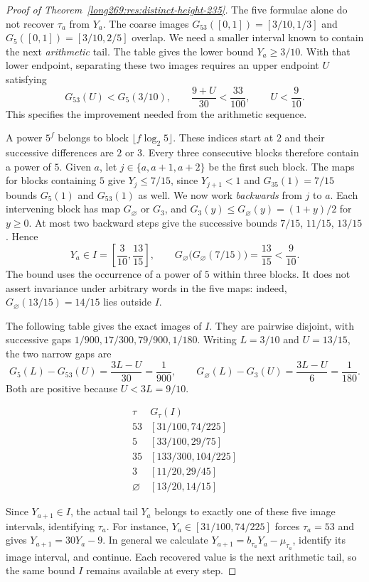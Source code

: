 \begin{proof}[Proof of Theorem~\ref{long269:res:distinct-height-235}]
The five formulae alone do not recover $\tau_a$ from $Y_a$.
The coarse images $G_{53}([0,1])=[3/10,1/3]$ and
$G_5([0,1])=[3/10,2/5]$ overlap. We need a smaller interval known to
contain the next \emph{arithmetic} tail. The table gives the lower bound
$Y_a\ge3/10$. With that lower endpoint, separating these two images
requires an upper endpoint $U$ satisfying
\[
 G_{53}(U)<G_5(3/10),\qquad
 \frac{9+U}{30}<\frac{33}{100},\qquad U<\frac9{10}.
\]
This specifies the improvement needed from the arithmetic sequence.

A power $5^f$ belongs to block $\lfloor f\log_2 5\rfloor$. These
indices start at $2$ and their successive differences are $2$ or $3$.
Every three consecutive blocks therefore contain a power of $5$.
Given $a$, let $j\in\{a,a+1,a+2\}$ be the first such block. The maps
for blocks containing $5$ give $Y_j\le7/15$, since $Y_{j+1}<1$ and
$G_{35}(1)=7/15$ bounds $G_5(1)$ and $G_{53}(1)$ as well.
We now work \emph{backwards} from $j$ to $a$. Each intervening block
has map $G_\varnothing$ or $G_3$, and
$G_3(y)\le G_\varnothing(y)=(1+y)/2$ for $y\ge0$.
At most two backward steps give the successive bounds
$7/15$, $11/15$, $13/15$. Hence
\begin{equation}\label{long269:eq:five-interval}
 Y_a\in I=\left[\frac3{10},\frac{13}{15}\right],\qquad
 G_\varnothing\bigl(G_\varnothing(7/15)\bigr)=\frac{13}{15}<\frac9{10}.
\end{equation}
The bound uses the occurrence of a power of $5$ within three blocks.
It does not assert invariance under arbitrary words in the five maps:
indeed, $G_\varnothing(13/15)=14/15$ lies outside $I$.

The following table gives the exact images of $I$. They
are pairwise disjoint, with successive gaps
$1/900,17/300,79/900,1/180$. Writing $L=3/10$ and $U=13/15$, the two
narrow gaps are
\[
 G_5(L)-G_{53}(U)=\frac{3L-U}{30}=\frac1{900},\qquad
 G_\varnothing(L)-G_3(U)=\frac{3L-U}{6}=\frac1{180}.
\]
Both are positive because $U<3L=9/10$.

\[
 \begin{array}{c|c}
 \tau&G_\tau(I)\\\hline
 53&[31/100,74/225]\\
 5&[33/100,29/75]\\
 35&[133/300,104/225]\\
 3&[11/20,29/45]\\
 \varnothing&[13/20,14/15]
 \end{array}
\]

Since $Y_{a+1}\in I$, the actual tail $Y_a$ belongs to exactly one of
these five image intervals, identifying $\tau_a$. For instance,
$Y_a\in[31/100,74/225]$ forces $\tau_a=53$ and gives $Y_{a+1}=30Y_a-9$.
In general we calculate $Y_{a+1}=b_{\tau_a}Y_a-\mu_{\tau_a}$, identify its
image interval, and continue. Each recovered value is the next arithmetic
tail, so the same bound $I$ remains available at every step.


\end{proof}
